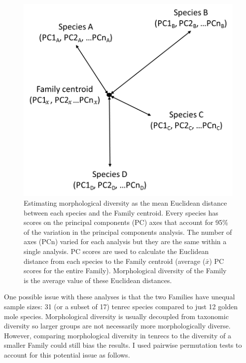 	\begin{figure}[!htbp]
	\centering
	\includegraphics [width=0.7\linewidth, height=0.7\textheight, keepaspectratio]{Disparity/writing/figures/Centroids.png}
	\caption[Calculating diversity as mean Euclidean distance to Family centroid.]
		{Estimating morphological diversity as the mean Euclidean distance between each species and the Family centroid. Every species has scores on the principal components (PC) axes that account for 95\% of the variation in the principal components analysis. The number of axes (PCn) varied for each analysis but they are the same within a single analysis. PC scores are used to calculate the Euclidean distance from each species to the Family centroid (average (\begin{math}
			\bar{x}
			\end{math}) PC scores for the entire Family). Morphological diversity of the Family is the average value of these Euclidean distances.}
	\label{fig:centroids}
	\end{figure}


	
	One possible issue with these analyses is that the two Families have unequal sample sizes: 31 (or a subset of 17) tenrec species compared to just 12 golden mole species. Morphological diversity is usually decoupled from taxonomic diversity \citep[e.g.][]{Ruta2013, Hopkins2013} so larger groups are not necessarily more morphologically diverse. However, comparing morphological diversity in tenrecs to the diversity of a smaller Family could still bias the results. I used pairwise permutation tests to account for this potential issue as follows. 

